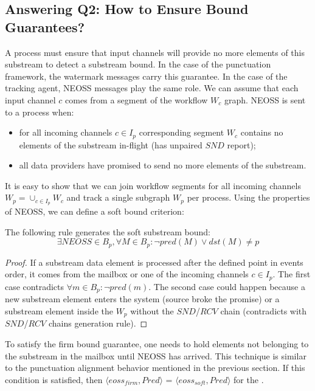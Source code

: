 \subsection*{Answering Q2: How to Ensure Bound Guarantees?}
A process must ensure that input channels will provide no more elements of this substream to detect a substream bound. In the case of the punctuation framework, the watermark messages carry this guarantee. In the case of the tracking agent, NEOSS messages play the same role. We can assume that each input channel $c$ comes from a segment of the workflow $W_c$ graph. NEOSS is sent to a process when:
\begin{itemize}
    \item for all incoming channels $c \in I_p$ corresponding segment $W_c$ contains no elements of the substream in-flight (has unpaired $SND$ report);
    \item all data providers have promised to send no more elements of the substream.
\end{itemize}
It is easy to show that we can join workflow segments for all incoming channels $W_p = \cup_{c\in I_p} W_c$ and track a single subgraph $W_p$ per process. Using the properties of NEOSS, we can define a soft bound criterion:
\begin{lemma}
The following rule generates the soft substream bound:
\begin{equation}
 \exists NEOSS \in B_p, \forall M\in B_p : \neg pred(M) \vee dst(M) \ne p
\end{equation}
\end{lemma}
\begin{proof}
If a substream data element is processed after the defined point in events order, it comes from the mailbox or one of the incoming channels $c \in I_p$. The first case contradicts $\forall m\in B_p : \neg pred(m)$. The second case could happen because a new substream element enters the system (source broke the promise) or a substream element inside the $W_p$ without the $SND$/$RCV$ chain (contradicts with $SND$/$RCV$ chains generation rule). 
\end{proof}

To satisfy the firm bound guarantee, one needs to hold elements not belonging to the substream in the mailbox until NEOSS has arrived. This technique is similar to the punctuation alignment behavior mentioned in the previous section. If this condition is satisfied, then $\langle eoss_{firm}, Pred\rangle$ = $\langle eoss_{soft}, Pred\rangle$ for the \tracker.

